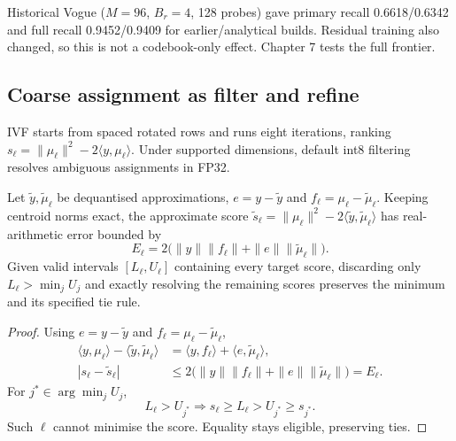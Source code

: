 Historical Vogue ($M=96$, $B_r=4$, 128 probes) gave primary recall 0.6618/0.6342 and full recall 0.9452/0.9409 for earlier/analytical builds. Residual training also changed, so this is not a codebook-only effect. Chapter 7 tests the full frontier.

\subsection{Coarse assignment as filter and refine}

IVF starts from spaced rotated rows and runs eight iterations, ranking $s_\ell=\|\mu_\ell\|^2-2\langle y,\mu_\ell\rangle$. Under supported dimensions, default int8 filtering resolves ambiguous assignments in FP32.

\begin{resultblock}
\begin{lemma}
\label{lem:4-assignment-bound}
Let $\widetilde y,\widetilde\mu_\ell$ be dequantised approximations,
$e=y-\widetilde y$ and $f_\ell=\mu_\ell-\widetilde\mu_\ell$.
Keeping centroid norms exact, the approximate score
$\widetilde s_\ell=\|\mu_\ell\|^2-2\langle\widetilde y,\widetilde\mu_\ell\rangle$
has real-arithmetic error bounded by
\begin{equation}
 E_\ell=2\bigl(\|y\|\|f_\ell\|+\|e\|\|\widetilde\mu_\ell\|\bigr).
 \label{eq:4-assignment-bound}
\end{equation}
Given valid intervals $[L_\ell,U_\ell]$ containing every target score,
discarding only $L_\ell>\min_j U_j$ and exactly resolving the remaining
scores preserves the minimum and its specified tie rule.
\end{lemma}
\begin{proof}
Using $e=y-\widetilde y$ and $f_\ell=\mu_\ell-\widetilde\mu_\ell$,
\[
 \begin{aligned}
 \langle y,\mu_\ell\rangle-
 \langle\widetilde y,\widetilde\mu_\ell\rangle
 &=\langle y,f_\ell\rangle
   +\langle e,\widetilde\mu_\ell\rangle,\\
 |s_\ell-\widetilde s_\ell|
 &\leq2\bigl(\|y\|\|f_\ell\|
       +\|e\|\|\widetilde\mu_\ell\|\bigr)=E_\ell .
 \end{aligned}
\]
For $j^*\in\arg\min_j U_j$,
\[
 L_\ell>U_{j^*}
 \Longrightarrow
 s_\ell\geq L_\ell>U_{j^*}\geq s_{j^*}.
\]
Such $\ell$ cannot minimise the score. Equality stays eligible, preserving ties.
\end{proof}
\end{resultblock}

